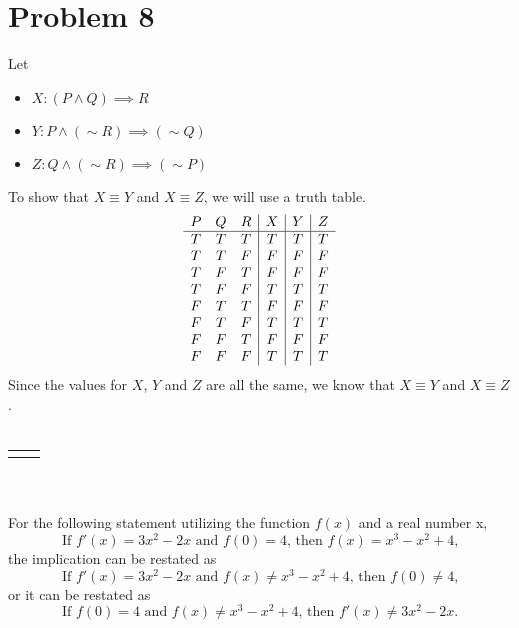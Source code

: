 \documentclass[11pt]{article}
\renewcommand{\line}{\begin{tabularx}{\textwidth}{X>{\raggedleft}X}\hline\\\end{tabularx}\\[-0.5cm]}
\begin{document}
\newpage


\section*{Problem 8}
Let 
\begin{itemize}
    \item $X : (P \wedge Q) \implies R$
    \item $Y : P \wedge (\sim R) \implies (\sim Q)$
    \item $Z : Q \wedge (\sim R) \implies (\sim P)$
\end{itemize}
To show that $X \equiv Y$ and $X \equiv Z$, we will use a truth table.
\begin{displaymath}
\begin{array}{c c c | c | c | c }
    P & Q & R & X & Y & Z\\
    \hline
    T & T & T & T & T & T\\
    T & T & F & F & F & F\\
    T & F & T & F & F & F\\
    T & F & F & T & T & T\\
    F & T & T & F & F & F\\
    F & T & F & T & T & T\\
    F & F & T & F & F & F\\
    F & F & F & T & T & T\\
\end{array}
\end{displaymath}
Since the values for $X$, $Y$ and $Z$ are all the same, we know that $X \equiv Y$ and $X \equiv Z$. \\
\\
\line
\\
For the following statement utilizing the function $f(x)$ and a real number x,\\
\begin{displaymath}
    \text{If }f'(x) = 3x^2 - 2x \text{ and } f(0) = 4\text{, then }f(x) = x^3 - x^2 +4\text{,}
\end{displaymath}
the implication can be restated as 
\begin{displaymath}
    \text{If }f'(x) = 3x^2 - 2x \text{ and } f(x) \neq x^3 - x^2 +4 \text{, then } f(0) \neq 4 \text{,}
\end{displaymath}
or it can be restated as
\begin{displaymath}
    \text{If }f(0) = 4 \text{ and } f(x) \neq x^3 - x^2 +4 \text{, then } f'(x) \neq 3x^2 - 2x \text{.}
\end{displaymath}
\end{document}
